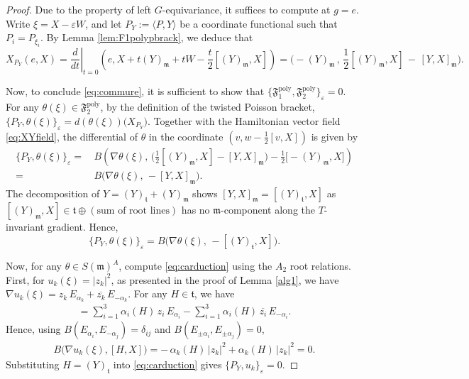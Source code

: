 \documentclass[11pt]{amsart}
\theoremstyle{definition}
\theoremstyle{plain}
\theoremstyle{conclusion}
\begin{document}
\begin{proof}
  Due to the property of left $G$-equivariance, it suffices to compute at $g=e$. Write $\xi=X-\varepsilon W$, and let $P_Y:=\langle P,Y \rangle$ be a coordinate functional such that $P_i=P_{\xi_i}$.  By Lemma \ref{lem:F1polypbrack}, we deduce that \begin{equation}
X_{P_Y}(e,X)= \left. \dfrac{d}{dt}\right\vert_{t =0} \left(e,X + t (Y)_\mathfrak{m} + tW -\frac{t}{2}[(Y)_\mathfrak{m},X]\right)  =\Big(-(Y)_{\mathfrak{m}}\,,\,\frac{1}{2}[(Y)_{\mathfrak{m}},X]\,-\,[Y,X]_{\mathfrak{m}}\Big). \label{eq:XYfield}
\end{equation}
 
Now, to conclude \eqref{eq:commure}, it is sufficient to show that $\{\mathfrak{F}_1^{\mathrm{poly}},\mathfrak{F}_2^{\mathrm{poly}}\}_\varepsilon = 0$. For any $\theta(\xi) \in \mathfrak{F}_2^{\mathrm{poly}}$, by the definition of the twisted Poisson bracket, $\{P_Y,\theta(\xi)\}_\varepsilon=d(\theta(\xi))\big(X_{P_Y}\big)$. Together with the Hamiltonian vector field \eqref{eq:XYfield}, the differential of $\theta$ in the coordinate $\left(v, w - \frac{1}{2}[v,X]\right)$ is given by
\begin{align*}
\{P_Y,\theta(\xi)\}_\varepsilon = & \,B\left(\nabla\theta(\xi),\,\Big(\frac{1}{2}[(Y)_{\mathfrak{m}},X]-[Y,X]_{\mathfrak{m}}\Big) -\frac{1}{2}\big[-(Y)_{\mathfrak{m}},X\big]\right) \\
= & \, B\big(\nabla\theta(\xi),\, -[Y,X]_{\mathfrak{m}}\big).
\end{align*} The decomposition of $Y=(Y)_{\mathfrak{t}}+(Y)_{\mathfrak{m}}$ shows $[Y,X]_{\mathfrak{m}}=[(Y)_{\mathfrak{t}},X]$ as $[(Y)_{\mathfrak{m}},X]\in\mathfrak{t}\oplus(\text{sum of root lines})$ has no $\mathfrak{m}$-component along the $T$-invariant gradient. Hence,
\begin{equation}\label{eq:carduction}
\{P_Y,\theta(\xi)\}_\varepsilon=B\big(\nabla\theta(\xi),\, -[(Y)_{\mathfrak{t}},X]\big).
\end{equation}

Now, for any $\theta \in S(\mathfrak{m})^A$, compute \eqref{eq:carduction} using the $A_2$ root relations. First, for $u_k(\xi)=|z_k|^2$, as presented in the proof of Lemma \ref{alg1}, we have $\nabla u_k(\xi)=z_k\,E_{\alpha_k}+\overline{z_k}\,E_{-\alpha_k}$. For any $H\in\mathfrak{t}$, we have \begin{align*}
[H,X]=\sum_{i=1}^3\alpha_i(H)\,z_i\,E_{\alpha_i}-\sum_{i=1}^3\alpha_i(H)\,\overline{z_i}\,E_{-\alpha_i}.
\end{align*} Hence, using $B(E_{\alpha_i},E_{-\alpha_j})=\delta_{ij}$ and $B(E_{\pm\alpha_i},E_{\pm\alpha_j})=0$,
\begin{align*}
B\big(\nabla u_k(\xi),[H,X]\big)
= -\,\alpha_k(H)\,|z_k|^2+\alpha_k(H)\,|z_k|^2=0.
\end{align*}
Substituting $H=(Y)_{\mathfrak{t}}$ into \eqref{eq:carduction} gives $\{P_Y,u_k\}_\varepsilon=0$.


\end{proof}
\end{document}
